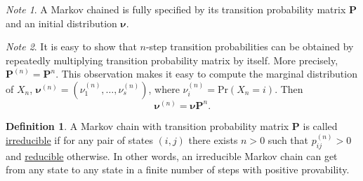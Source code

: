 \documentclass[11pt]{article}\usepackage[]{graphicx}\usepackage[]{color}
\numberwithin{algorithm}{section}
\theoremstyle{remark}
\newtheorem*{mynote}{Note}
\theoremstyle{definition}
\newtheorem*{define}{Definition}
\begin{document}
\begin{mynote}
  A Markov chained is fully specified by its transition probability matrix $\mathbf{P}$ 
  and an initial distribution $\boldsymbol{\nu}$.
\end{mynote}

\begin{mynote}
  It is easy to show that $n$-step transition probabilities can be obtained by repeatedly multiplying
  transition probability matrix by itself. More precisely, $\mathbf{P}^{(n)} = \mathbf{P}^n$. This observation
  makes it easy to compute the marginal distribution of $X_n$, 
  $\boldsymbol{\nu}^{(n)} = (\nu_1^{(n)},\dots,\nu_s^{(n)})$, 
  where $ \nu_i^{(n)} = \text{Pr}(X_n = i)$. Then  
  \begin{equation*}
    \boldsymbol{\nu}^{(n)} = \boldsymbol{\nu} \mathbf{P}^n.
  \end{equation*}
\end{mynote}

\begin{define}
  A Markov chain with transition probability matrix $\mathbf{P}$ is called \underline{irreducible} if 
  for any pair of states $(i,j)$ there exists $n > 0$ such that $p_{ij}^{(n)} > 0$ and 
  \underline{reducible} otherwise. In other words,
  an irreducible Markov chain can get from any state to any state in a finite number of steps with 
  positive provability.
\end{define}
\end{document}
